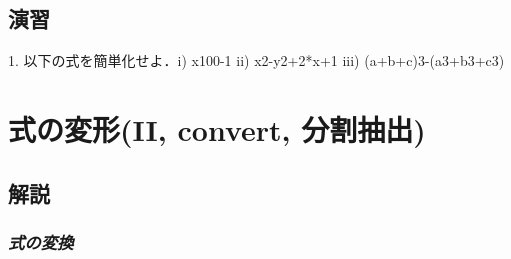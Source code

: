 \documentclass{article}
\begin{document}
\begin{maplegroup}
\begin{mapleinput}
\end{mapleinput}
\mapleresult
\begin{maplelatex}
\end{maplelatex}
\mapleresult
\begin{maplelatex}
\end{maplelatex}
\end{maplegroup}
\subsection{\textbf{演習}}
\begin{maplegroup}
\begin{Maple Normal}{
1. 以下の式を簡単化せよ．i) x100-1  ii) x2-y2+2*x+1 iii) (a+b+c)3-(a3+b3+c3)}\end{Maple Normal}

\end{maplegroup}
\begin{maplelatex}\begin{Maple Normal}{
}\end{Maple Normal}
\end{maplelatex}
\begin{maplegroup}
\newpage
\end{maplegroup}
\section{\textbf{式の変形(II, convert, 分割抽出)}}
\subsection{\textbf{解説}}
\subsubsection{\textbf{\textit{式の変換}}}
\end{document}
